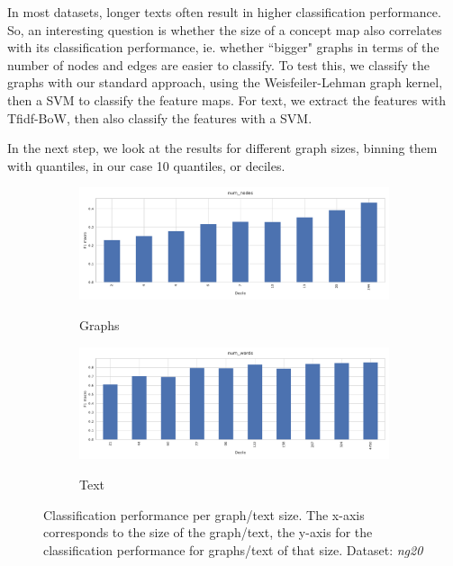 In most datasets, longer texts often result in higher classification performance.
So, an interesting question is whether the size of a concept map also correlates with its classification performance, ie. whether ``bigger" graphs in terms of the number of nodes and edges are easier to classify.
To test this, we classify the graphs with our standard approach, using the Weisfeiler-Lehman graph kernel, then a SVM to classify the feature maps.
For text, we extract the features with Tfidf-BoW, then also classify the features with a SVM.

\iffalse
In the next step, we look at the results for different graph sizes, binning them with quantiles, in our case 10 quantiles, or deciles.

\begin{figure}[htb!]
	\begin{subfigure}[t]{.5\linewidth}	{\includegraphics[width=\linewidth]{assets/figures/graph_binning_num_nodes.pdf}\label{fig:todo_1}}
	\caption{Graphs}
	\end{subfigure}
	\hfill
		\begin{subfigure}[t]{.5\linewidth}
	{\includegraphics[width=\linewidth]{assets/figures/text_binning_num_words.pdf}\label{fig:todo_2}}
	\caption{Text}
	\end{subfigure}
	\caption[Statistics: Histogram of classification performance per graph/text size]{Classification performance per graph/text size. The x-axis corresponds to the size of the graph/text, the y-axis for the classification performance for graphs/text of that size. Dataset: \textit{ng20}}\label{fig:graph_size_performance}
\end{figure}


